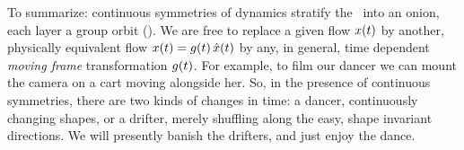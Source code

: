 \documentclass[aip,cha,reprint,
secnumarabic,
nofootinbib, tightenlines,
nobibnotes, showkeys, showpacs,
groupedaddress
]{revtex4-1}
\begin{document}
To summarize: continuous symmetries of dynamics stratify the \statesp\
into an onion, each layer a group orbit (). We are
free to replace a given flow $x(t)$ by another, physically
equivalent flow $x(t)=g(t)\,\hat{x}(t)$ by any, in
general, time dependent {\em moving
frame} transformation
$g(t)$. For example, to film our dancer we can mount the camera
on a cart moving alongside her. So, in the presence of continuous symmetries,
there are two kinds of changes in time: a dancer, continuously changing
shapes, or a drifter, merely shuffling along the easy, shape invariant directions. We will presently banish the drifters, and just enjoy the
dance.

\end{document}
